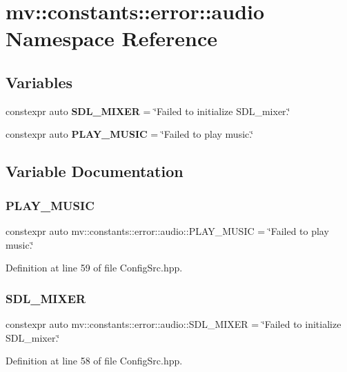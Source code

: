 \section{mv\+:\+:constants\+:\+:error\+:\+:audio Namespace Reference}
\label{namespacemv_1_1constants_1_1error_1_1audio}
\subsection*{Variables}
\begin{DoxyCompactItemize}
\item 
constexpr auto \textbf{ S\+D\+L\+\_\+\+M\+I\+X\+ER} = \char`\"{}Failed to initialize S\+D\+L\+\_\+mixer.\char`\"{}
\item 
constexpr auto \textbf{ P\+L\+A\+Y\+\_\+\+M\+U\+S\+IC} = \char`\"{}Failed to play music.\char`\"{}
\end{DoxyCompactItemize}


\subsection{Variable Documentation}
\mbox{\label{namespacemv_1_1constants_1_1error_1_1audio_a9d93e97c5a71c15cf0cf58cdcbe3447f}} 
\subsubsection{P\+L\+A\+Y\+\_\+\+M\+U\+S\+IC}
{\footnotesize\ttfamily constexpr auto mv\+::constants\+::error\+::audio\+::\+P\+L\+A\+Y\+\_\+\+M\+U\+S\+IC = \char`\"{}Failed to play music.\char`\"{}}



Definition at line 59 of file Config\+Src.\+hpp.

\mbox{\label{namespacemv_1_1constants_1_1error_1_1audio_ac5507ff91a6fbea5e7d56d5c55ce0069}} 
\subsubsection{S\+D\+L\+\_\+\+M\+I\+X\+ER}
{\footnotesize\ttfamily constexpr auto mv\+::constants\+::error\+::audio\+::\+S\+D\+L\+\_\+\+M\+I\+X\+ER = \char`\"{}Failed to initialize S\+D\+L\+\_\+mixer.\char`\"{}}



Definition at line 58 of file Config\+Src.\+hpp.

